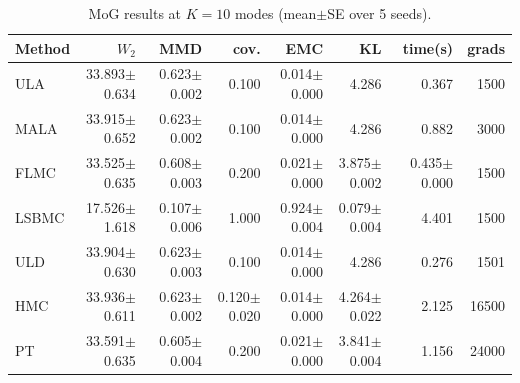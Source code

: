 \begin{table}[t]
\centering
\small
\caption{MoG results at $K=10$ modes (mean$\pm$SE over 5 seeds).}
\label{tab:mog_K10}
\begin{tabular}{lrrrrrrr}
\toprule
Method & $W_2$ & MMD & cov. & EMC & KL & time(s) & grads \\
\midrule
ULA & 33.893$\pm$0.634 & 0.623$\pm$0.002 & 0.100 & 0.014$\pm$0.000 & 4.286 & 0.367 & 1500 \\
MALA & 33.915$\pm$0.652 & 0.623$\pm$0.002 & 0.100 & 0.014$\pm$0.000 & 4.286 & 0.882 & 3000 \\
FLMC & 33.525$\pm$0.635 & 0.608$\pm$0.003 & 0.200 & 0.021$\pm$0.000 & 3.875$\pm$0.002 & 0.435$\pm$0.000 & 1500 \\
LSBMC & 17.526$\pm$1.618 & 0.107$\pm$0.006 & 1.000 & 0.924$\pm$0.004 & 0.079$\pm$0.004 & 4.401 & 1500 \\
ULD & 33.904$\pm$0.630 & 0.623$\pm$0.003 & 0.100 & 0.014$\pm$0.000 & 4.286 & 0.276 & 1501 \\
HMC & 33.936$\pm$0.611 & 0.623$\pm$0.002 & 0.120$\pm$0.020 & 0.014$\pm$0.000 & 4.264$\pm$0.022 & 2.125 & 16500 \\
PT & 33.591$\pm$0.635 & 0.605$\pm$0.004 & 0.200 & 0.021$\pm$0.000 & 3.841$\pm$0.004 & 1.156 & 24000 \\
\bottomrule
\end{tabular}
\end{table}
